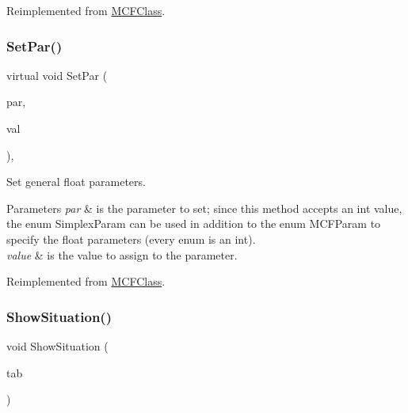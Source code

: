 Reimplemented from \mbox{\hyperlink{class_m_c_f_class_ab8e162715d8454f30679c10372db4db8}{M\+C\+F\+Class}}.

\mbox{\label{class_m_c_f_simplex_ae6eb12cc8e2e124b236bf84ebeddab70}} 
\subsubsection{\texorpdfstring{Set\+Par()}{SetPar()}\hspace{0.1cm}{\footnotesize\ttfamily [2/2]}}
{\footnotesize\ttfamily virtual void Set\+Par (\begin{DoxyParamCaption}\item[{int}]{par,  }\item[{double}]{val }\end{DoxyParamCaption})\hspace{0.3cm}{\ttfamily [override]}, {\ttfamily [virtual]}}

Set general float parameters.


\begin{DoxyParams}{Parameters}
{\em par} & is the parameter to set; since this method accepts an int value, the enum Simplex\+Param can be used in addition to the enum M\+C\+F\+Param to specify the float parameters (every enum is an int).\\
\hline
{\em value} & is the value to assign to the parameter. \\
\hline
\end{DoxyParams}


Reimplemented from \mbox{\hyperlink{class_m_c_f_class_a4acd81f913880873c577de03a4fa1959}{M\+C\+F\+Class}}.

\mbox{\label{class_m_c_f_simplex_a949fac27f80532ba4d8584fbc57a2aaf}} 
\subsubsection{\texorpdfstring{Show\+Situation()}{ShowSituation()}}
{\footnotesize\ttfamily void Show\+Situation (\begin{DoxyParamCaption}\item[{int}]{tab }\end{DoxyParamCaption})\hspace{0.3cm}{\ttfamily [private]}}

